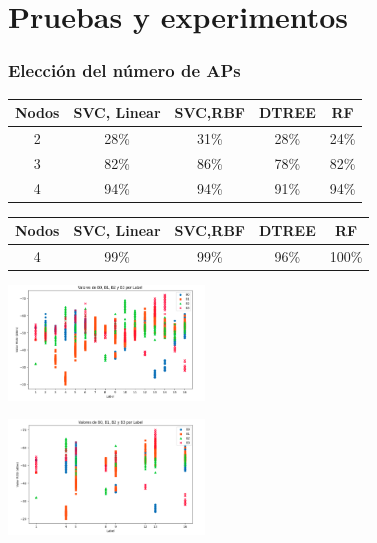\documentclass{beamer}
\begin{document}
\section{Pruebas y experimentos}
\begin{frame}
\frametitle{Elección del número de APs}
\centering

\begin{table}[H]
\begin{center}
\begin{tabular}{|c|c|c|c|c|}
\hline
\textbf{Nodos} & \textbf{SVC, Linear} & \textbf{SVC,RBF} & \textbf{DTREE} & \textbf{RF} \\
\hline
2 & 28\% & 31\% & 28\% & 24\% \\  
3 & 82\% & 86\% & 78\% & 82\% \\   
4 & 94\% & 94\% & 91\% & 94\% \\   
\hline
\end{tabular}
\label{cuadro:tabla2}
\end{center}
\end{table}

\begin{table}[H]
\begin{center}
\begin{tabular}{|c|c|c|c|c|}
\hline
\textbf{Nodos} & \textbf{SVC, Linear} & \textbf{SVC,RBF} & \textbf{DTREE} & \textbf{RF} \\
\hline
4 & 99\% & 99\% & 96\% & 100\% \\  
\hline
\end{tabular}
\label{cuadro:tabla3}
\end{center}
\end{table}

\begin{minipage}{0.45\textwidth}
    \centering
    \includegraphics[width=5.2cm]{figs/vals1.png}
\end{minipage}
\hfill
\begin{minipage}{0.45\textwidth}
    \centering
    \includegraphics[width=5.2cm]{figs/vals2.png}
\end{minipage}

\vspace{0.3cm} %
\end{frame}
\end{document}
